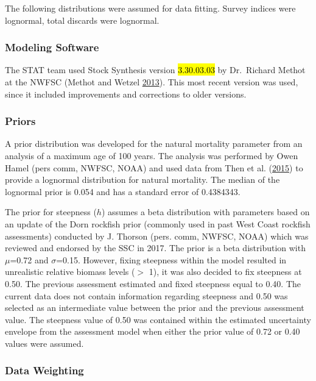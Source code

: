 \documentclass[12pt,]{article}
\begin{document}
The following distributions were assumed for data fitting. Survey
indices were lognormal, total discards were lognormal.

\subsubsection{Modeling Software}\label{modeling-software}

The STAT team used Stock Synthesis version \hl{3.30.03.03} by
Dr.~Richard Methot at the NWFSC (Methot and Wetzel
\protect\hyperlink{ref-methot_stock_2013}{2013}). This most recent
version was used, since it included improvements and corrections to
older versions.

\subsubsection{Priors}\label{priors}

A prior distribution was developed for the natural mortality parameter
from an analysis of a maximum age of 100 years. The analysis was
performed by Owen Hamel (pers comm, NWFSC, NOAA) and used data from Then
et al. (\protect\hyperlink{ref-then_evaluating_2015}{2015}) to provide a
lognormal distribution for natural mortality. The median of the
lognormal prior is 0.054 and has a standard error of 0.4384343.

The prior for steepness (\(h\)) assumes a beta distribution with
parameters based on an update of the Dorn rockfish prior (commonly used
in past West Coast rockfish assessments) conducted by J. Thorson (pers.
comm, NWFSC, NOAA) which was reviewed and endorsed by the SSC in 2017.
The prior is a beta distribution with \(\mu\)=0.72 and \(\sigma\)=0.15.
However, fixing steepness within the model resulted in unrealistic
relative biomass levels (\(>\) 1), it was also decided to fix steepness
at 0.50. The previous assessment estimated and fixed steepness equal to
0.40. The current data does not contain information regarding steepness
and 0.50 was selected as an intermediate value between the prior and the
previous assessment value. The steepness value of 0.50 was contained
within the estimated uncertainty envelope from the assessment model when
either the prior value of 0.72 or 0.40 values were assumed.

\subsubsection{Data Weighting}\label{data-weighting}
\end{document}
